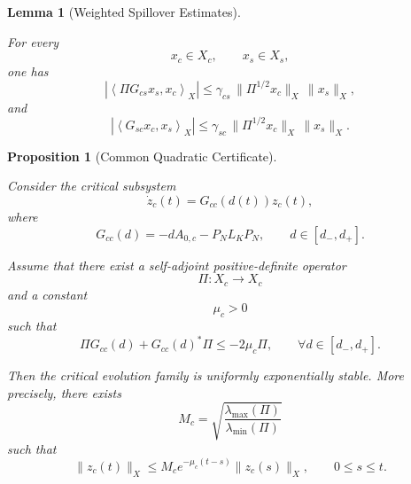 \documentclass[10pt,a4paper]{amsart}
\newtheorem{lemma}{Lemma}
\newtheorem{proposition}{Proposition}
\begin{document}
\begin{lemma}[Weighted Spillover Estimates]
\label{lem:weighted-spillover-estimates}

For every
\[
x_c\in X_c,
\qquad
x_s\in X_s,
\]
one has
\begin{equation}
\left|
\left\langle
\Pi G_{cs}x_s,x_c
\right\rangle_X
\right|
\le
\gamma_{cs}
\,
\|\Pi^{1/2}x_c\|_X
\,
\|x_s\|_X,
\label{eq:weighted-critical-to-residual-estimate}
\end{equation}
and
\begin{equation}
\left|
\left\langle
G_{sc}x_c,x_s
\right\rangle_X
\right|
\le
\gamma_{sc}
\,
\|\Pi^{1/2}x_c\|_X
\,
\|x_s\|_X.
\label{eq:weighted-residual-to-critical-estimate}
\end{equation}

\end{lemma}

\begin{proposition}[Common Quadratic Certificate]
\label{prop:critical-quadratic-certificate}

Consider the critical subsystem
\begin{equation}
\dot z_c(t)
=
G_{cc}(d(t))z_c(t),
\label{eq:critical-subsystem}
\end{equation}
where
\[
G_{cc}(d)
=
-dA_{0,c}
-
P_NL_KP_N,
\qquad
d\in[d_-,d_+].
\]

Assume that there exist a self-adjoint positive-definite operator
\[
\Pi:X_c\rightarrow X_c
\]
and a constant
\[
\mu_c>0
\]
such that
\begin{equation}
\Pi G_{cc}(d)
+
G_{cc}(d)^*\Pi
\le
-2\mu_c\Pi,
\qquad
\forall d\in[d_-,d_+].
\label{eq:critical-LMI}
\end{equation}

Then the critical evolution family is uniformly exponentially stable.
More precisely, there exists
\[
M_c
=
\sqrt{
\frac{\lambda_{\max}(\Pi)}
{\lambda_{\min}(\Pi)}
}
\]
such that
\begin{equation}
\|z_c(t)\|_X
\le
M_c
e^{-\mu_c(t-s)}
\|z_c(s)\|_X,
\qquad
0\le s\le t.
\label{eq:critical-exp-estimate}
\end{equation}

\end{proposition}
\end{document}
